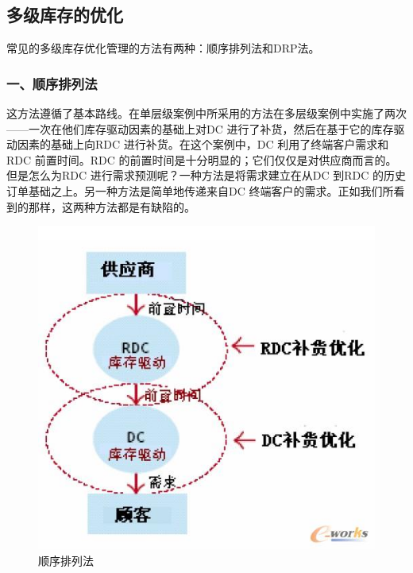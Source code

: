 \subsection { 多级库存的优化}

    常见的多级库存优化管理的方法有两种：顺序排列法和DRP法。

\subsubsection { 一、顺序排列法}

    这方法遵循了基本路线。在单层级案例中所采用的方法在多层级案例中实施了两次——一次在他们库存驱动因素的基础上对DC 进行了补货，然后在基于它的库存驱动因素的基础上向RDC 进行补货。在这个案例中，DC 利用了终端客户需求和RDC 前置时间。RDC 的前置时间是十分明显的；它们仅仅是对供应商而言的。但是怎么为RDC 进行需求预测呢？一种方法是将需求建立在从DC 到RDC 的历史订单基础之上。另一种方法是简单地传递来自DC 终端客户的需求。正如我们所看到的那样，这两种方法都是有缺陷的。

    \begin{figure}[bcth]
        \begin{center}
            \includegraphics[scale=.6] {mlopt-1.jpg}
            \caption{顺序排列法} \label{fig:mlopt1}
        \end{center}
    \end{figure}

